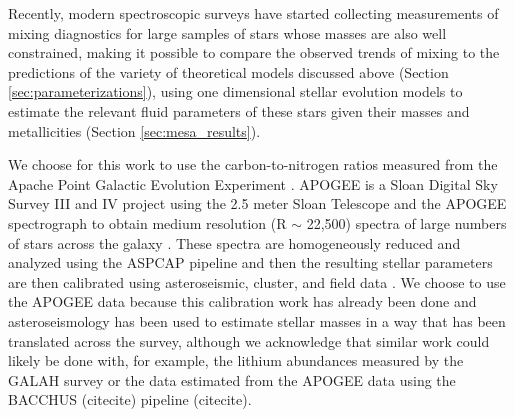 Recently, modern spectroscopic surveys have started collecting measurements of mixing diagnostics for large samples of stars whose masses are also well constrained, making it possible to compare the observed trends of mixing to the predictions of the variety of theoretical models discussed above (Section \ref{sec:parameterizations}), using one dimensional stellar evolution models to estimate the relevant fluid parameters of these stars given their masses and metallicities (Section \ref{sec:mesa_results}). 



We choose for this work to use the carbon-to-nitrogen ratios measured from the Apache Point Galactic Evolution Experiment \citep[APOGEE, ][]{Majewski2015,Majewski2017}. APOGEE is a Sloan Digital Sky Survey III and IV \citep{Blanton2017} project using the 2.5 meter Sloan Telescope \citep{Gunn2006} and the APOGEE spectrograph \citep{Wilson2019} to obtain medium resolution (R $\sim$ 22,500) spectra of large numbers of stars across the galaxy \citep{Zasowski2017, Beaton2021,?}. These spectra are homogeneously reduced and analyzed using the ASPCAP pipeline \citep{Nidever2015, Zamora2015, GarciaPerez2016} and then the resulting stellar parameters are then calibrated using asteroseismic, cluster, and field data \citep{Holtzman2015,Holtzman2018, Jonsson2020}. We choose to use the APOGEE data because this calibration work has already been done and asteroseismology has been used to estimate stellar masses in a way that has been translated across the survey, although we acknowledge that similar work could likely be done with, for example, the lithium abundances measured by the GALAH survey \citep{buder2019} or the \ctwelvecthirteen data estimated from the APOGEE data using the BACCHUS (citecite) pipeline (citecite). 

